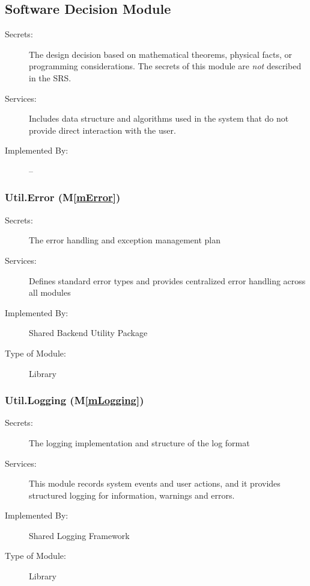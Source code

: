 \documentclass[12pt, titlepage]{article}
\newcommand{\mref}[1]{M\ref{#1}}
\begin{document}
\subsection{Software Decision Module}

\begin{description}
\item[Secrets:] The design decision based on mathematical theorems, physical
  facts, or programming considerations. The secrets of this module are
  \emph{not} described in the SRS.
\item[Services:] Includes data structure and algorithms used in the system that
  do not provide direct interaction with the user.
\item[Implemented By:] --
\end{description}

\subsubsection{Util.Error (\mref{mError})}

\begin{description}
\item[Secrets:] The error handling and exception management plan
\item[Services:] Defines standard error types and provides centralized error handling across all modules
\item[Implemented By:] Shared Backend Utility Package
\item[Type of Module:] Library
\end{description}


\subsubsection{Util.Logging (\mref{mLogging})}

\begin{description}
\item[Secrets:] The logging implementation and structure of the log format
\item[Services:] This module records system events and user actions, and it provides structured logging for information, warnings and errors.
\item[Implemented By:] Shared Logging Framework
\item[Type of Module:] Library
\end{description}
\end{document}
